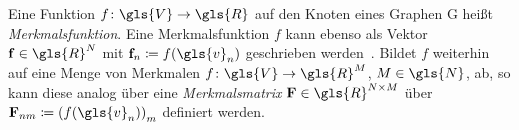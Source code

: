 Eine Funktion $f \colon \gls{V} \to \gls{R}$ auf den Knoten eines Graphen \gls{G} heißt \emph{Merkmalsfunktion}.
Eine Merkmalsfunktion $f$ kann ebenso als Vektor $\ve{f} \in \gls{R}^N$ mit $ \ve{f}_n \coloneqq f\left(\gls{v}_n\right)$ geschrieben werden~\cite{Shuman}.
Bildet $f$ weiterhin auf eine Menge von Merkmalen $f \colon \gls{V} \to \gls{R}^M$, $M \in \gls{N}$, ab, so kann diese analog über eine \emph{Merkmalsmatrix} $\ma{F} \in \gls{R}^{N \times M}$ über $\ma{F}_{nm} \coloneqq {\left(f\left(\gls{v}_n\right)\right)}_m$ definiert werden.
